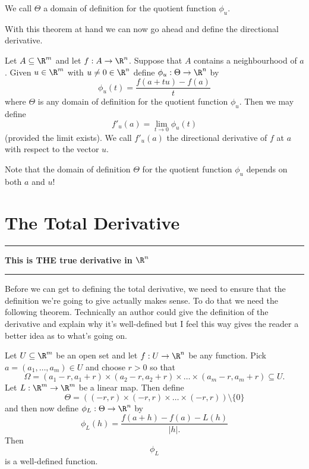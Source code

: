			\begin{remark}
				We call $\Theta$ a domain of definition for the quotient function $\phi_u$.
			\end{remark}
		
		With this theorem at hand we can now go ahead and define the directional derivative.
		
		\begin{definition}
			Let $A \subseteq \R^m$ and let $f : A \to \R^n$. Suppose that $A$ contains a neighbourhood of $a$. Given $u \in \R^m$ with $u  \neq 0 \in \R^n$ define $\phi_u : \Theta \to \R^n$  by $$\phi_u(t) = \frac{f(a+tu)-f(a)}{t}$$ where $\Theta$ is any domain of definition for the quotient function $\phi_u$. Then we may define $$f'_u(a) = \lim_{t \to 0} \phi_u(t)$$ (provided the limit exists). We call $f'_u(a)$ the directional derivative of $f$ at $a$ with respect to the vector $u$.
		\end{definition}
		
		
		\begin{remark}
			Note that the domain of definition $\Theta$ for the quotient function $\phi_u$ depends on both $a$ and $u$!
		\end{remark}

		
		
		
		
		\newpage
		
		\section{The Total Derivative}
		
		\bigskip
		
		\hrule
		\medskip
		\textbf{This is THE true derivative in $\R^n$}
		\\
		\hrule
		\bigskip
		
		Before we can get to defining the total derivative, we need to ensure that the definition we're going to give actually makes sense. To do that we need the following theorem. Technically an author could give the definition of the derivative and explain why it's well-defined but I feel this way gives the reader a better idea as to what's going on.
		
		\begin{theorem}
			Let $U \subseteq \R^m$ be an open set and let $f : U \to \R^n$ be any function. Pick $a = (a_1, \dots, a_m) \in U$ and choose $r > 0$ so that $$\Omega = \left(a_1 - r, a_1 + r \right) \times \left(a_2 - r, a_2 + r \right) \times \dots \times \left(a_m - r, a_m + r \right)   \subseteq U.$$ Let $L : \R^m \to \R^m$ be a linear map. Then define $$\Theta = \left((-r, r) \times (-r, r) \times \dots \times (-r, r) \right) \setminus \{0\}$$  and then now define $\phi_L : \Theta \to \R^n$ by $$\phi_L(h) = \frac{f(a+h) - f(a) - L(h)}{|h|.}$$ Then $$\phi_L$$ is a well-defined function.
		\end{theorem}
		

